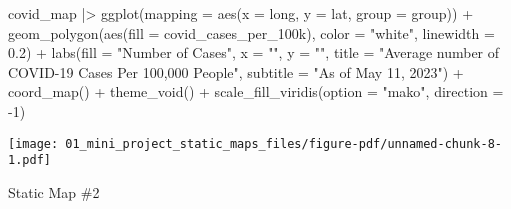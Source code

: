 \documentclass[
  letterpaper,
  DIV=11,
  numbers=noendperiod]{scrartcl}
\newenvironment{Shaded}{\begin{snugshade}}{\end{snugshade}}
\newcommand{\AttributeTok}[1]{\textcolor[rgb]{0.40,0.45,0.13}{#1}}
\newcommand{\DecValTok}[1]{\textcolor[rgb]{0.68,0.00,0.00}{#1}}
\newcommand{\FloatTok}[1]{\textcolor[rgb]{0.68,0.00,0.00}{#1}}
\newcommand{\FunctionTok}[1]{\textcolor[rgb]{0.28,0.35,0.67}{#1}}
\newcommand{\NormalTok}[1]{\textcolor[rgb]{0.00,0.23,0.31}{#1}}
\newcommand{\SpecialCharTok}[1]{\textcolor[rgb]{0.37,0.37,0.37}{#1}}
\newcommand{\StringTok}[1]{\textcolor[rgb]{0.13,0.47,0.30}{#1}}
\begin{document}
\begin{Shaded}
\begin{Highlighting}[]
\NormalTok{covid\_map }\SpecialCharTok{|\textgreater{}}
  \FunctionTok{ggplot}\NormalTok{(}\AttributeTok{mapping =} \FunctionTok{aes}\NormalTok{(}\AttributeTok{x =}\NormalTok{ long, }\AttributeTok{y =}\NormalTok{ lat,}
                       \AttributeTok{group =}\NormalTok{ group)) }\SpecialCharTok{+}
  \FunctionTok{geom\_polygon}\NormalTok{(}\FunctionTok{aes}\NormalTok{(}\AttributeTok{fill =}\NormalTok{ covid\_cases\_per\_100k), }\AttributeTok{color =} \StringTok{"white"}\NormalTok{, }\AttributeTok{linewidth =} \FloatTok{0.2}\NormalTok{) }\SpecialCharTok{+}
  \FunctionTok{labs}\NormalTok{(}\AttributeTok{fill =} \StringTok{"Number of Cases"}\NormalTok{,}
       \AttributeTok{x =} \StringTok{""}\NormalTok{,}
       \AttributeTok{y =} \StringTok{""}\NormalTok{,}
       \AttributeTok{title =} \StringTok{"Average number of COVID{-}19 Cases Per 100,000 People"}\NormalTok{,}
       \AttributeTok{subtitle =} \StringTok{"As of May 11, 2023"}\NormalTok{) }\SpecialCharTok{+}
  \FunctionTok{coord\_map}\NormalTok{() }\SpecialCharTok{+}
  \FunctionTok{theme\_void}\NormalTok{() }\SpecialCharTok{+}
  \FunctionTok{scale\_fill\_viridis}\NormalTok{(}\AttributeTok{option =} \StringTok{"mako"}\NormalTok{, }\AttributeTok{direction =} \SpecialCharTok{{-}}\DecValTok{1}\NormalTok{)}
\end{Highlighting}
\end{Shaded}

\texttt{[image: 01\_mini\_project\_static\_maps\_files/figure-pdf/unnamed-chunk-8-1.pdf]}

Static Map \#2
\end{document}
